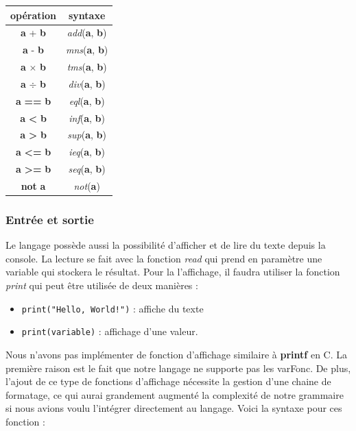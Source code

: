 \documentclass[a4paper]{article}%
\begin{document}
\begin{center}
\begin{tabular}{ | c | c | }
    \hline
    opération & syntaxe\\
    \hline
    \textbf{a} + \textbf{b} & \textit{add}(\textbf{a}, \textbf{b})\\
    \hline
    \textbf{a} - \textbf{b} & \textit{mns}(\textbf{a}, \textbf{b})\\
    \hline
    \textbf{a} $\times$ \textbf{b} & \textit{tms}(\textbf{a}, \textbf{b})\\
    \hline
    \textbf{a} $\div$ \textbf{b} & \textit{div}(\textbf{a}, \textbf{b})\\
    \hline
    \textbf{a} \textbf{==} \textbf{b} & \textit{eql}(\textbf{a}, \textbf{b})\\
    \hline
    \textbf{a} \textbf{<} \textbf{b} & \textit{inf}(\textbf{a}, \textbf{b})\\
    \hline
    \textbf{a} \textbf{>} \textbf{b} & \textit{sup}(\textbf{a}, \textbf{b})\\
    \hline
    \textbf{a} \textbf{<=} \textbf{b} & \textit{ieq}(\textbf{a}, \textbf{b})\\
    \hline
    \textbf{a} \textbf{>=} \textbf{b} & \textit{seq}(\textbf{a}, \textbf{b})\\
    \hline
    \textbf{not} \textbf{a} & \textit{not}(\textbf{a})\\
    \hline
\end{tabular}
\end{center}

\subsubsection*{Entrée et sortie}

Le langage possède aussi la possibilité d'afficher et de lire du texte depuis la
console. La lecture se fait avec la fonction \textit{read} qui prend en
paramètre une variable qui stockera le résultat. Pour la l'affichage, il faudra
utiliser la fonction \textit{print} qui peut être utilisée de deux manières :

\begin{itemize}
  \item \lstinline{print("Hello, World!")} : affiche du texte
  \item \lstinline{print(variable)} : affichage d'une valeur.
\end{itemize}

Nous n'avons pas implémenter de fonction d'affichage similaire à \textbf{printf}
en C. La première raison est le fait que notre langage ne supporte pas les
\gls{varFonc}. De plus, l'ajout de ce type de fonctions d'affichage nécessite la
gestion d'une chaine de formatage, ce qui aurai grandement augmenté la
complexité de notre grammaire si nous avions voulu l'intégrer directement au
langage. Voici la syntaxe pour ces fonction :
\end{document}
